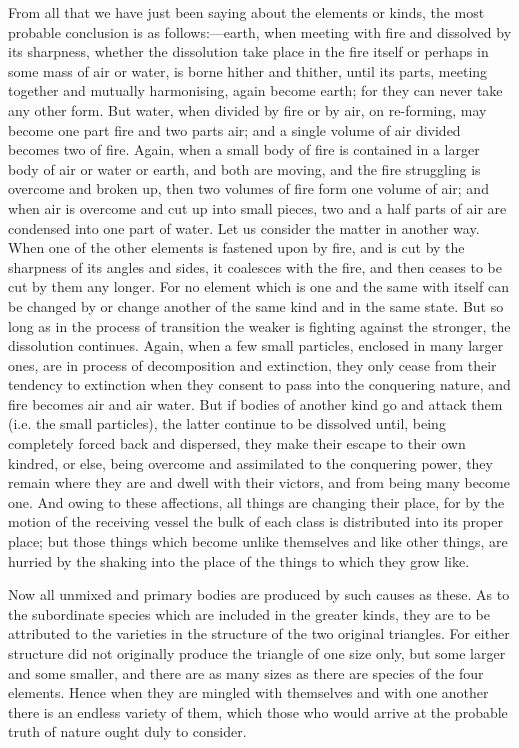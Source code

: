 From all that we have just been saying about the elements or kinds, the
most probable conclusion is as follows:—earth, when meeting with
fire and dissolved by its sharpness, whether the dissolution take place in
the fire itself or perhaps in some mass of air or water, is borne hither
and thither, until its parts, meeting together and mutually harmonising,
again become earth; for they can never take any other form. But water,
when divided by fire or by air, on re-forming, may become one part fire
and two parts air; and a single volume of air divided becomes two of fire.
Again, when a small body of fire is contained in a larger body of air or
water or earth, and both are moving, and the fire struggling is overcome
and broken up, then two volumes of fire form one volume of air; and when
air is overcome and cut up into small pieces, two and a half parts of air
are condensed into one part of water. Let us consider the matter in
another way. When one of the other elements is fastened upon by fire, and
is cut by the sharpness of its angles and sides, it coalesces with the
fire, and then ceases to be cut by them any longer. For no element which
is one and the same with itself can be changed by or change another of the
same kind and in the same state. But so long as in the process of
transition the weaker is fighting against the stronger, the dissolution
continues. Again, when a few small particles, enclosed in many larger
ones, are in process of decomposition and extinction, they only cease from
their tendency to extinction when they consent to pass into the conquering
nature, and fire becomes air and air water. But if bodies of another kind
go and attack them (i.e. the small particles), the latter continue to be
dissolved until, being completely forced back and dispersed, they make
their escape to their own kindred, or else, being overcome and assimilated
to the conquering power, they remain where they are and dwell with their
victors, and from being many become one. And owing to these affections,
all things are changing their place, for by the motion of the receiving
vessel the bulk of each class is distributed into its proper place; but
those things which become unlike themselves and like other things, are
hurried by the shaking into the place of the things to which they grow
like.

Now all unmixed and primary bodies are produced by such causes as these.
As to the subordinate species which are included in the greater kinds,
they are to be attributed to the varieties in the structure of the two
original triangles. For either structure did not originally produce the
triangle of one size only, but some larger and some smaller, and there are
as many sizes as there are species of the four elements. Hence when they
are mingled with themselves and with one another there is an endless
variety of them, which those who would arrive at the probable truth of
nature ought duly to consider.

